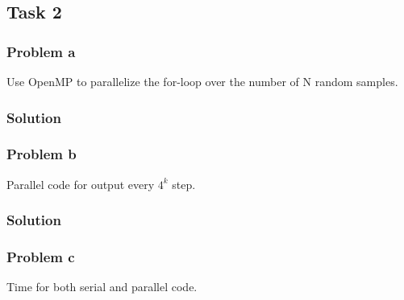 \documentclass{article}
\begin{document}
\subsection*{Task 2}
\subsubsection*{Problem a}
 Use OpenMP to parallelize the for-loop over the number of N random samples.
 \subsubsection*{Solution}



\subsubsection*{Problem b}
Parallel code for output every $4^k$  step. 
 \subsubsection*{Solution}




\subsubsection*{Problem c}
Time for both serial and parallel code.
\end{document}
